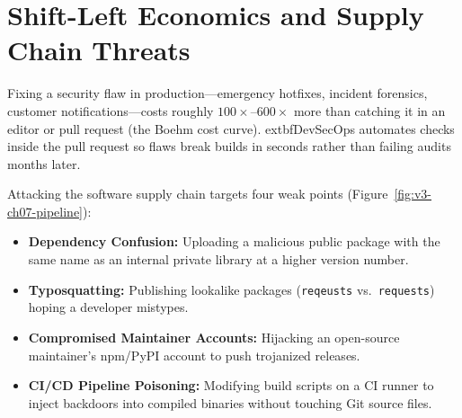 \section{Shift-Left Economics and Supply Chain Threats}

Fixing a security flaw in production—emergency hotfixes, incident forensics, customer notifications—costs roughly $100\times$--$600\times$ more than catching it in an editor or pull request (the Boehm cost curve). 	extbf{DevSecOps} automates checks inside the pull request so flaws break builds in seconds rather than failing audits months later.

Attacking the software supply chain targets four weak points (Figure~\ref{fig:v3-ch07-pipeline}):
\begin{itemize}[leftmargin=12pt]
  \item \textbf{Dependency Confusion:} Uploading a malicious public package with the same name as an internal private library at a higher version number.
  \item \textbf{Typosquatting:} Publishing lookalike packages (\texttt{reqeusts} vs.\ \texttt{requests}) hoping a developer mistypes.
  \item \textbf{Compromised Maintainer Accounts:} Hijacking an open-source maintainer's npm/PyPI account to push trojanized releases.
  \item \textbf{CI/CD Pipeline Poisoning:} Modifying build scripts on a CI runner to inject backdoors into compiled binaries without touching Git source files.
\end{itemize}

